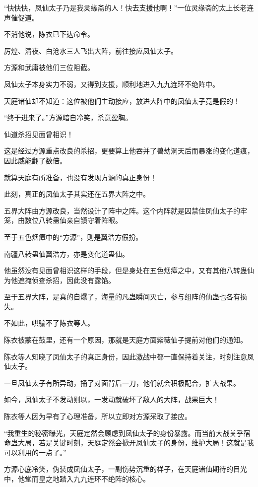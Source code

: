 \begin{this_body}
“快快快，凤仙太子乃是我灵缘斋的人！快去支援他啊！”一位灵缘斋的太上长老连声催促道。

不消他说，陈衣已下达命令。

厉煌、清夜、白沧水三人飞出大阵，前往接应凤仙太子。

方源和武庸被他们三位阻截。

凤仙太子本身实力不弱，又得到支援，顺利地进入九九连环不绝阵中。

天庭诸仙却不知道：这位被他们主动接应，放进大阵中的凤仙太子竟是假的！

“终于进来了。”方源暗自冷笑，杀意盈胸。

仙道杀招见面曾相识！

这是经过方源重点改良的杀招，更要算上他吞并了兽劫洞天后而暴涨的变化道痕，因此威能翻了数倍。

就算天庭有所准备，也没有发现方源的真正身份！

此刻，真正的凤仙太子其实还在五界大阵之中。

五界大阵由方源改良，当然设计了阵中之阵。这个内阵就是囚禁住凤仙太子的牢笼，由数位八转蛊仙亲自镇守着阵眼。

至于五色烟瘴中的“方源”，则是翼浩方假扮。

南疆八转蛊仙翼浩方，亦是变化道蛊仙。

他虽然没有见面曾相识这样的手段，但是身处在五色烟瘴之中，又有其他八转蛊仙为他遮掩侦查杀招，因此没有露馅。

至于五界大阵，是真的自爆了，海量的凡蛊瞬间灭亡，参与组阵的仙蛊也各有损失。

不如此，哄骗不了陈衣等人。

陈衣被蒙在鼓里，还有一个原因，那就是天庭方面紫薇仙子提前对他们的通知。

陈衣等人知晓了凤仙太子的真正身份，因此激战中都一直保持着关注，时刻注意凤仙太子。

一旦凤仙太子有所异动，捅了对面背后一刀，他们就会积极配合，扩大战果。

如今，凤仙太子不发动则以，一发动就破坏了敌人的大阵，战果巨大！

陈衣等人因为早有了心理准备，所以立即对方源采取了接应。

“我重生的秘密曝光，天庭定然会顾虑到凤仙太子的身份暴露。而当前大战关乎宿命蛊大局，若是关键时刻，天庭定然会掀开凤仙太子的身份，维护大局！这就是我可以利用的一点了。”

方源心底冷笑，伪装成凤仙太子，一副伤势沉重的样子，在天庭诸仙期待的目光中，他堂而皇之地踏入九九连环不绝阵的核心。


\end{this_body}

